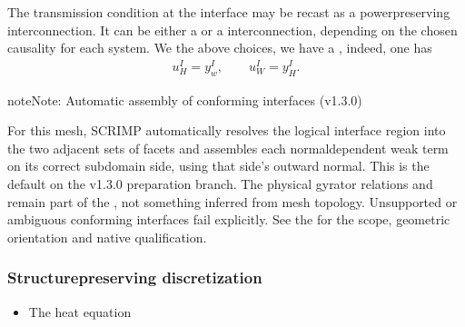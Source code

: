 \documentclass[letterpaper,10pt,english]{sphinxmanual}
\begin{document}
\sphinxAtStartPar
The transmission condition at the interface may be recast as a
power\sphinxhyphen{}preserving interconnection. It can be either a  or a
 interconnection, depending on the chosen causality for
each system. We the above choices, we have a , indeed, one has
\begin{equation*}
\begin{split}u^I_H = y^I_w, \qquad u^I_W = y^I_H.\end{split}
\end{equation*}
\begin{sphinxadmonition}{note}{Note:}
\sphinxAtStartPar
Automatic assembly of conforming interfaces (v1.3.0)

\sphinxAtStartPar
For this  mesh, SCRIMP automatically resolves the
logical interface region  into the two adjacent sets of
facets and assembles each normal\sphinxhyphen{}dependent weak term on its
correct subdomain side, using that side’s outward normal. This
is the default on the v1.3.0 preparation branch. The physical
gyrator relations  and  remain
part of the , not something inferred from mesh topology.
Unsupported or ambiguous conforming interfaces fail explicitly.
See the 
for the scope, geometric orientation and native qualification.
\end{sphinxadmonition}


\subsubsection{Structure\sphinxhyphen{}preserving discretization}
\label{\detokenize{examples/heat_wave:structure-preserving-discretization}}\begin{itemize}
\item {} 
\sphinxAtStartPar
The heat equation

\end{itemize}
\end{document}
